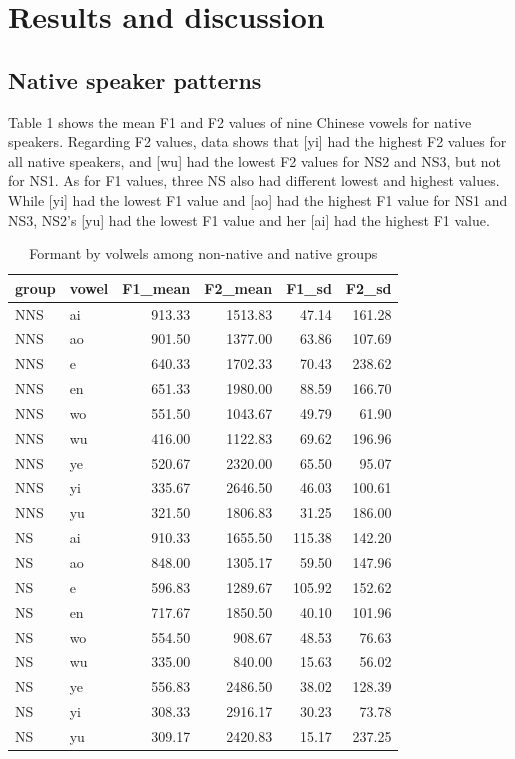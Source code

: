 \documentclass[man, fleqn, noextraspace]{apa6}
\begin{document}
\section{Results and discussion}\label{results-and-discussion}

\subsection{Native speaker patterns}\label{native-speaker-patterns}

Table 1 shows the mean F1 and F2 values of nine Chinese vowels for
native speakers. Regarding F2 values, data shows that {[}yi{]} had the
highest F2 values for all native speakers, and {[}wu{]} had the lowest
F2 values for NS2 and NS3, but not for NS1. As for F1 values, three NS
also had different lowest and highest values. While {[}yi{]} had the
lowest F1 value and {[}ao{]} had the highest F1 value for NS1 and NS3,
NS2's {[}yu{]} had the lowest F1 value and her {[}ai{]} had the highest
F1 value.

\begin{table}

\caption{\label{tab:table1}Formant by volwels among non-native and native groups}
\centering
\begin{tabular}[t]{llrrrr}
\toprule
group & vowel & F1\_mean & F2\_mean & F1\_sd & F2\_sd\\
\midrule
NNS & ai & 913.33 & 1513.83 & 47.14 & 161.28\\
NNS & ao & 901.50 & 1377.00 & 63.86 & 107.69\\
NNS & e & 640.33 & 1702.33 & 70.43 & 238.62\\
NNS & en & 651.33 & 1980.00 & 88.59 & 166.70\\
NNS & wo & 551.50 & 1043.67 & 49.79 & 61.90\\
\addlinespace
NNS & wu & 416.00 & 1122.83 & 69.62 & 196.96\\
NNS & ye & 520.67 & 2320.00 & 65.50 & 95.07\\
NNS & yi & 335.67 & 2646.50 & 46.03 & 100.61\\
NNS & yu & 321.50 & 1806.83 & 31.25 & 186.00\\
NS & ai & 910.33 & 1655.50 & 115.38 & 142.20\\
\addlinespace
NS & ao & 848.00 & 1305.17 & 59.50 & 147.96\\
NS & e & 596.83 & 1289.67 & 105.92 & 152.62\\
NS & en & 717.67 & 1850.50 & 40.10 & 101.96\\
NS & wo & 554.50 & 908.67 & 48.53 & 76.63\\
NS & wu & 335.00 & 840.00 & 15.63 & 56.02\\
\addlinespace
NS & ye & 556.83 & 2486.50 & 38.02 & 128.39\\
NS & yi & 308.33 & 2916.17 & 30.23 & 73.78\\
NS & yu & 309.17 & 2420.83 & 15.17 & 237.25\\
\bottomrule
\end{tabular}
\end{table}
\end{document}
